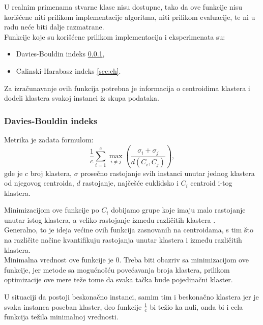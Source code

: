 \documentclass[a4paper,serbian]{symopissr}
\begin{document}
U realnim primenama stvarne klase nisu dostupne, tako da ove funkcije nisu korišćene niti prilikom implementacije algoritma, niti prilikom evaluacije, te ni u radu neće biti dalje razmatrane.\\

Funkcije koje su korišćene prilikom implementacija i eksperimenata su:
\begin{itemize}
	\item Davies-Bouldin indeks \ref{sec:db},
	\item Calinski-Harabasz indeks \ref{sec:ch}.
\end{itemize}

Za izračunavanje ovih funkcija potrebna je informacija o centroidima klastera i dodeli klastera svakoj instanci iz skupa podataka.   

\subsubsection{Davies-Bouldin indeks}
\label{sec:db}
Metrika \cite{db_index} je zadata formulom:
%
\begin{equation}
\frac{1}{c}\sum_{i=1}^{c}\max_{i \neq j} \left( \frac{\sigma_i + \sigma_j}{d(C_i, C_j)} \right),
\end{equation}
%
gde je $c$ broj klastera, $\sigma$ prosečno rastojanje svih instanci unutar jednog klastera od njegovog centroida, $d$ rastojanje, najčešće euklidsko i $C_i$ centroid i-tog klastera.

Minimizacijom ove funkcije po $C_i$ dobijamo grupe koje imaju malo rastojanje unutar istog klastera, a veliko rastojanje između različitih klastera \cite{db_index}.\\ 

Generalno, to je ideja većine ovih funkcija zasnovanih na centroidama, s tim što na različite načine kvantifikuju rastojanja unutar klastera i između različitih klastera. \\

Minimalna vrednost ove funkcije je 0. Treba biti obazriv sa minimizacijom ove funkcije, jer metode sa mogućnošću povećavanja broja klastera, prilikom optimizacije ove mere teže tome da svaka tačka bude pojedinačni klaster.

U situaciji da postoji beskonačno instanci, samim tim i beskonačno klastera jer je svaka instanca poseban klaster, deo funkcije $\frac{1}{c}$ bi težio ka nuli, onda bi i cela funkcija težila minimalnoj vrednosti.
\end{document}
